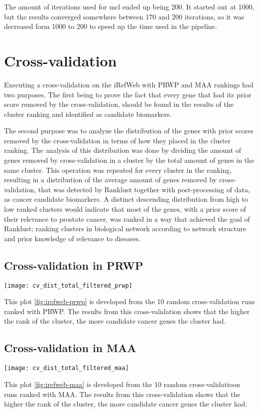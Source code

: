 The amount of iterations used for \gls{mcl} ended up being 200. It started out
at 1000, but the results converged somewhere between 170 and 200 iterations, so
it was decreased form 1000 to 200 to speed up the time used in the
\gls{pipeline}.

\section{Cross-validation}
Executing a cross-validation on the iRefWeb with PRWP and MAA rankings had two
purposes. The first being to prove the fact that every gene that had its prior
score removed by the cross-validation, should be found in the results of the
cluster ranking and identified as candidate biomarkers. 

The second purpose was to analyze the distribution of the genes with prior
scores removed by the cross-validation in terms of how they placed in the
cluster ranking. The analysis of this distribution was done by dividing the
amount of genes removed by cross-validation in a cluster by the total amount of
genes in the same cluster. This operation was repeated for every cluster in the
ranking, resulting in a distribution of the average amount of genes removed by
cross-validation, that was detected by Ranklust together with post-processing of
data, as cancer candidate biomarkers. A distinct descending distribution from
high to low ranked clusters would indicate that most of the genes, with a prior
score of their relevance to prostate cancer, was ranked in a way that achieved
the goal of Ranklust; ranking clusters in biological network according to
network structure and prior knowledge of relevance to diseases.

\subsection{Cross-validation in PRWP}
\begin{sidewaysfigure}[H]
    \texttt{[image: cv\_dist\_total\_filtered\_prwp]}
    \label{fig:irefweb-prwp}
    \caption{Cross-validation distribution in clusters (PRWP)}
\end{sidewaysfigure}
This plot \ref{fig:irefweb-prwp} is developed from the 10 random
cross-validation runs ranked with PRWP. The results from this cross-validation
shows that the higher the rank of the cluster, the more candidate cancer genes
the cluster had.

\subsection{Cross-validation in MAA}
\begin{sidewaysfigure}[H]
    \texttt{[image: cv\_dist\_total\_filtered\_maa]}
    \label{fig:irefweb-maa}
    \caption{Cross-validation distribution in clusters (MAA)}
\end{sidewaysfigure}
This plot \ref{fig:irefweb-maa} is developed from the 10 random
cross-validatioon runs ranked with MAA. The results from this cross-validation
shows that the higher the rank of the cluster, the more candidate cancer genes
the cluster had.

